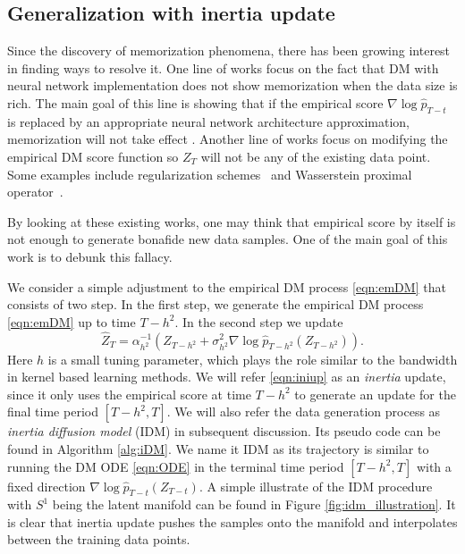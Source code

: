 \documentclass{article}
\def\phat{\hat{p}}
\def\Zhat{\widehat{Z}}
\begin{document}
\subsection{Generalization with inertia update} 
Since the discovery of memorization phenomena, there has been growing interest in finding ways to resolve it. One line of works  focus on the fact that DM with neural network implementation does not show memorization when the data size is rich. The main goal of this line is showing that if the empirical score $\nabla \log \phat_{T-t}$ is replaced by an appropriate neural network architecture approximation, memorization will not take effect \cite{oko2023diffusion,tang2024adaptivity,azangulov2024convergence}. Another line of works focus on modifying the empirical DM score function so $Z_T$ will not be any of the existing data point. Some examples include 
regularization schemes~\cite{baptista2025memorization}
and Wasserstein proximal operator~\cite{zhang2024wasserstein}.

By looking at these existing works, one may think that empirical score by itself is not enough to generate bonafide new data samples. One of the main goal of this work is to debunk this fallacy. 

We consider a simple adjustment to the empirical DM process \eqref{eqn:emDM} that consists of two step. In the first step, we generate the empirical DM process \eqref{eqn:emDM} up to time $T-h^2$. In the second step we update 
\begin{equation}
\label{eqn:iniup}
\Zhat_T=\alpha_{h^2}^{-1}(Z_{T-h^2}+\sigma^2_{h^2} \nabla \log \phat_{T-h^2}(Z_{T-h^2})). 
\end{equation}
Here $h$ is a small tuning parameter, which plays the role similar to the bandwidth in kernel based learning methods. We will refer \eqref{eqn:iniup} as an \emph{inertia} update, since it only uses the empirical score at time $T-h^2$ to generate an update for the final time period $[T-h^2,T]$. We will also refer the data generation process as \emph{inertia diffusion model} (IDM) in subsequent discussion. Its pseudo code can be found in Algorithm \ref{alg:iDM}. We name it IDM as its trajectory is similar to running the DM ODE \eqref{eqn:ODE} in the terminal time period $[T-h^2, T]$ with a fixed direction $\nabla \log \phat_{T-t}(Z_{T-t})$. A simple illustrate of the IDM procedure with $S^1$ being the latent manifold can be found in Figure \ref{fig:idm_illustration}. It is clear that inertia update pushes the samples onto the manifold and interpolates between the training data points.
\end{document}

